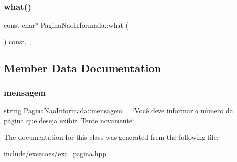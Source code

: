 \subsubsection{\texorpdfstring{what()}{what()}}
{\footnotesize\ttfamily const char$\ast$ Pagina\+Nao\+Informada\+::what (\begin{DoxyParamCaption}{ }\end{DoxyParamCaption}) const\hspace{0.3cm}{\ttfamily [inline]}, {\ttfamily [override]}, {\ttfamily [noexcept]}}



\subsection{Member Data Documentation}
\mbox{\label{classPaginaNaoInformada_ac24c6f91d5c86702424530c6b0fba7ec}} 
\subsubsection{\texorpdfstring{mensagem}{mensagem}}
{\footnotesize\ttfamily string Pagina\+Nao\+Informada\+::mensagem = \char`\"{}Você deve informar o número da página que deseja exibir. Tente novamente\char`\"{}\hspace{0.3cm}{\ttfamily [private]}}



The documentation for this class was generated from the following file\+:\begin{DoxyCompactItemize}
\item 
include/excecoes/\hyperlink{exc__pagina_8hpp}{exc\+\_\+pagina.\+hpp}\end{DoxyCompactItemize}
